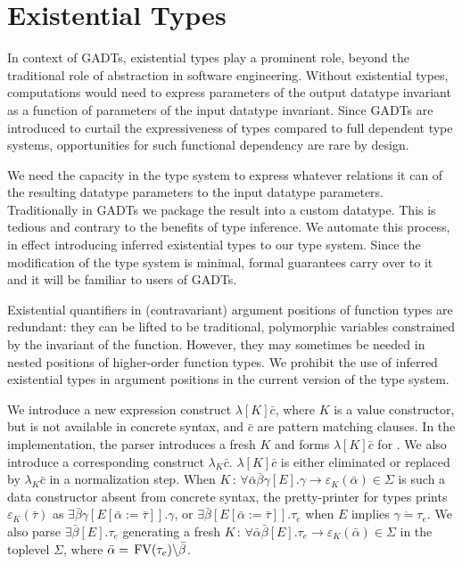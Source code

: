 \documentclass{article}
\newcommand{\assign}{:=}
\newcommand{\colons}{\,:\,}
\newcommand{\tmop}[1]{\ensuremath{\operatorname{#1}}}
\newcommand{\tmverbatim}[1]{{\ttfamily{#1}}}
\begin{document}
\section{Existential Types}\label{ExTypes}

In context of GADTs, existential types play a prominent role, beyond the
traditional role of abstraction in software engineering. Without existential
types, computations would need to express parameters of the output datatype
invariant as a function of parameters of the input datatype invariant. Since
GADTs are introduced to curtail the expressiveness of types compared to full
dependent type systems, opportunities for such functional dependency are rare
by design.

We need the capacity in the type system to express whatever relations it can
of the resulting datatype parameters to the input datatype parameters.
Traditionally in GADTs we package the result into a custom datatype. This is
tedious and contrary to the benefits of type inference. We automate this
process, in effect introducing inferred existential types to our type system.
Since the modification of the type system is minimal, formal guarantees carry
over to it and it will be familiar to users of GADTs.

Existential quantifiers in (contravariant) argument positions of function
types are redundant: they can be lifted to be traditional, polymorphic
variables constrained by the invariant of the function. However, they may
sometimes be needed in nested positions of higher-order function types. We
prohibit the use of inferred existential types in argument positions in the
current version of the type system.

We introduce a new expression construct $\lambda [K] \bar{c}$, where $K$ is a
value constructor, but is not available in concrete syntax, and $\bar{c}$ are
pattern matching clauses. In the implementation, the parser introduces a fresh
$K$ and forms $\lambda [K] \bar{c}$ for \tmverbatim{efunction $\bar{c}$}. We
also introduce a corresponding construct $\lambda_K \bar{c}$. $\lambda [K]
\bar{c}$ is either eliminated or replaced by $\lambda_K \bar{c}$ in a
normalization step. When $K \colons \forall \bar{\alpha} \bar{\beta} \gamma
[E] . \gamma \rightarrow \varepsilon_K (\bar{\alpha}) \in \Sigma$ is such a
data constructor absent from concrete syntax, the pretty-printer for types
prints $\varepsilon_K (\bar{\tau})$ as $\exists \bar{\beta} \gamma [E
[\bar{\alpha} \assign \bar{\tau}]] . \gamma$, or $\exists \bar{\beta} [E
[\bar{\alpha} \assign \bar{\tau}]] . \tau_e$ when $E$ implies $\gamma \dot{=}
\tau_e$. We also parse $\exists \bar{\beta} [E] . \tau_e$ generating a fresh
$K \colons \forall \bar{\alpha} \bar{\beta} [E] . \tau_e \rightarrow
\varepsilon_K (\bar{\alpha}) \in \Sigma$ in the toplevel $\Sigma$, where
$\bar{\alpha} = {\nobreak} \tmop{FV} (\tau_e) \backslash \bar{\beta}$.
\end{document}

